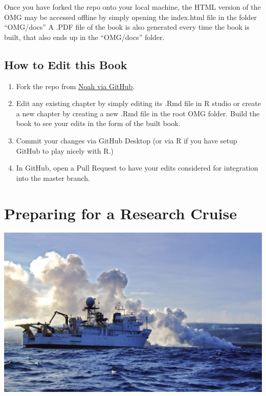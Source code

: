 \documentclass[]{book}
\providecommand{\tightlist}{%
  \setlength{\itemsep}{0pt}\setlength{\parskip}{0pt}}
\begin{document}
Once you have forked the repo onto your local machine, the HTML version of the OMG may be accessed offline by simply opening the index.html file in the folder ``OMG/docs'' A .PDF file of the book is also generated every time the book is built, that also ends up in the ``OMG/docs'' folder.

\hypertarget{how-to-edit-this-book}{%
\section*{How to Edit this Book}\label{how-to-edit-this-book}}

\begin{enumerate}
\def\labelenumi{\arabic{enumi}.}
\tightlist
\item
  Fork the repo from \href{https://github.com/npomeroy/OMG}{Noah via GitHub}.
\item
  Edit any existing chapter by simply editing its .Rmd file in R studio or create a new chapter by creating a new .Rmd file in the root OMG folder. Build the book to see your edits in the form of the built book.
\item
  Commit your changes via GitHub Desktop (or via R if you have setup GitHub to play nicely with R.)
\item
  In GitHub, open a Pull Request to have your edits considered for integration into the master branch.
\end{enumerate}

\hypertarget{cruise_prep}{%
\chapter{Preparing for a Research Cruise}\label{cruise_prep}}

\includegraphics{images/Sette_Big_Island_2010_Pomeroy.jpg}
\end{document}
